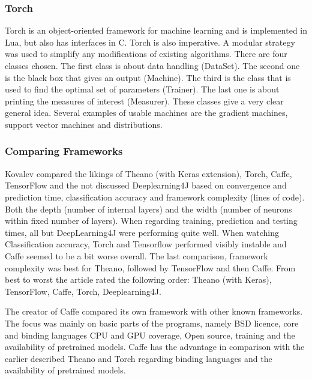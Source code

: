 \documentclass[10pt,a4paper]{article}
\begin{document}
	\subsubsection{Torch}
	
	Torch is an object-oriented framework for machine learning and is 
	implemented in Lua, but also has interfaces in C. Torch is also 
	imperative.\cite{rampasek2016tensorflow} A modular strategy was used to 
	simplify any 
	modifications of existing algorithms. There are four classes chosen. The 
	first class is about data handling (DataSet). The second one is the black 
	box that gives an output (Machine). The third is the class that is used to 
	find the optimal set of parameters (Trainer). The last one is about 
	printing the measures of interest (Measurer). These classes give a very 
	clear general idea. Several examples of usable machines are the gradient 
	machines, support vector machines and distributions. 
	\cite{collobert2002torch}
	
	\subsubsection{Comparing Frameworks}

	Kovalev compared the likings of Theano (with Keras extension), Torch, 
	Caffe, TensorFlow and the not discussed Deeplearning4J based on convergence 
	and prediction time, classification accuracy and framework complexity 
	(lines of code). Both the depth (number of internal layers) and the width 
	(number of neurons within fixed number of layers). When regarding training, 
	prediction and testing times, all but DeepLearning4J were performing quite 
	well. When watching Classification accuracy, Torch and Tensorflow performed 
	visibly instable and Caffe seemed to be a bit worse overall. The last 
	comparison, framework complexity was best for Theano, followed by 
	TensorFlow and then Caffe. From best to worst the article rated the 
	following order: Theano (with Keras), TensorFlow, Caffe, Torch, 
	Deeplearning4J.	\cite{kovalev2016deep}

	The creator of Caffe compared its own framework with other known 
	frameworks. The focus was mainly on basic parts of the programs, namely BSD 
	licence, core and binding languages CPU and GPU coverage, Open source, 
	training and the availability of pretrained models. Caffe has the advantage 
	in comparison with the earlier described Theano and Torch regarding binding 
	languages and the availability of pretrained 
	models.\cite{DBLP:journals/corr/JiaSDKLGGD14}
	
\end{document}
